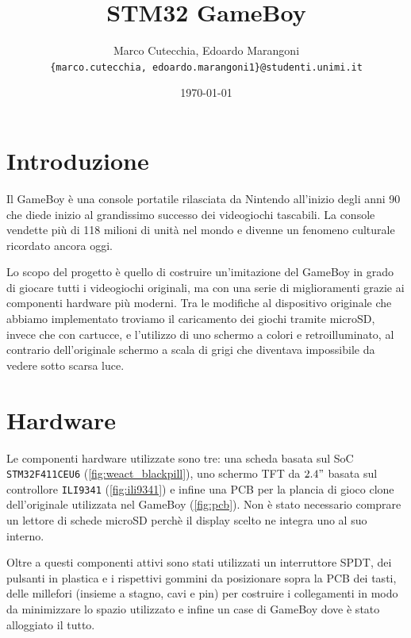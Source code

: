 \documentclass[hidelinks,12pt]{article}
\title{STM32 GameBoy}
\date{\today}
\author{Marco Cutecchia, Edoardo Marangoni \\
\footnotesize \texttt{\{marco.cutecchia, edoardo.marangoni1\}@studenti.unimi.it} \\ }
\begin{document}
\maketitle

\section{Introduzione}
Il GameBoy è una console portatile rilasciata da Nintendo all'inizio degli anni
90 che diede inizio al grandissimo successo dei videogiochi tascabili.
La console vendette più di 118 milioni di unità nel mondo e divenne un fenomeno
culturale ricordato ancora oggi.

Lo scopo del progetto è quello di costruire un'imitazione del GameBoy in grado
di giocare tutti i videogiochi originali, ma con una serie di miglioramenti
grazie ai componenti hardware più moderni. Tra le modifiche al dispositivo
originale che abbiamo implementato troviamo il caricamento dei giochi tramite
microSD, invece che con cartucce, e l'utilizzo di uno schermo a colori e
retroilluminato, al contrario dell'originale schermo a scala di grigi che
diventava impossibile da vedere sotto scarsa luce.

\section{Hardware}
Le componenti hardware utilizzate sono tre: una scheda basata sul
SoC \texttt{STM32F411CEU6} (\cref{fig:weact_blackpill}),
uno schermo TFT da $2.4"$ basata sul controllore \texttt{ILI9341}
(\cref{fig:ili9341}) e infine una PCB per la plancia di gioco clone
dell'originale utilizzata nel GameBoy (\cref{fig:pcb}).
Non è stato necessario comprare un lettore di schede microSD perchè il
display scelto ne integra uno al suo interno.

Oltre a questi componenti attivi sono stati utilizzati un interruttore SPDT,
dei pulsanti in plastica e i rispettivi gommini da posizionare sopra la PCB
dei tasti, delle millefori (insieme a stagno, cavi e pin) per costruire i
collegamenti in modo da minimizzare lo spazio utilizzato e infine un case di
GameBoy dove è stato alloggiato il tutto.
\end{document}
